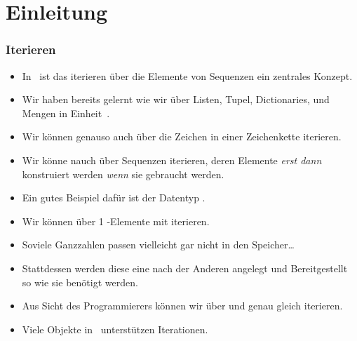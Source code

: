 \documentclass[aspectratio=169,mathserif,notheorems]{beamer}%
\subtitle{34.~Iteration}%
\begin{document}
%
%
\startPresentation%
%
\section{Einleitung}%
\begin{frame}%
\frametitle{Iterieren}%
\begin{itemize}%
%
\item In \python\ ist das iterieren über die Elemente von Sequenzen ein zentrales Konzept.%
%
\item<2-> Wir haben bereits gelernt wie wir über Listen, Tupel, Dictionaries, und Mengen in Einheit~\unitEnumerate.%
%
\item<3-> Wir können genauso auch über die Zeichen in einer Zeichenkette iterieren.%
%
\item<4-> Wir könne nauch über Sequenzen iterieren, deren Elemente \emph{erst dann} konstruiert werden \emph{wenn} sie gebraucht werden.%
%
\item<5-> Ein gutes Beispiel dafür ist der Datentyp .%
%
\item<6-> Wir können über 1 -Elemente mit  iterieren.%
%
\item<7-> Soviele Ganzzahlen passen vielleicht gar nicht in den Speicher\dots%
%
\item<8-> Stattdessen werden diese eine nach der Anderen angelegt und Bereitgestellt so wie sie benötigt werden.%
%
\item<9-> Aus Sicht des Programmierers können wir über  und  genau gleich iterieren.%
%
\item<10-> Viele Objekte in \python\ unterstützen Iterationen.%
%
\end{itemize}%
\end{frame}%
%
\end{document}
